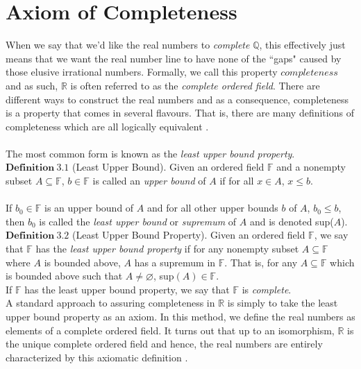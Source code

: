 \documentclass[12pt]{article}
\theoremstyle{definition}
\theoremstyle{remark}
\begin{document}
\section{Axiom of Completeness}
 When we say that we'd like the real numbers to \textit{complete} $\mathbb{Q}$, this effectively just means that we want the real number line to have none of the ``gaps" caused by those elusive irrational numbers. Formally, we call this property $\textit{completeness}$ and as such, $\mathbb{R}$ is often referred to as the \textit{complete ordered field}. There are different ways to construct the real numbers and as a consequence, completeness is a property that comes in several flavours. That is, there are many definitions of completeness which are all logically equivalent \cite[pg. 1]{approaches}.\\\\
The most common form is known as the \textit{least upper bound property}.\\

\noindent $\mathbf{Definition\ 3.1}$ (Least Upper Bound)\cite[pg.20]{paper}. Given an ordered field $\mathbb{F}$ and a nonempty subset $A\subseteq\mathbb{F}$, $b\in\mathbb{F}$ is called an \textit{upper bound} of $A$ if for all $x\in A$, $x\leq b$.\\\\
If $b_0\in\mathbb{F}$ is an upper bound of $A$ and for all other upper bounds $b$ of $A$, $b_0\leq b$, then $b_0$ is called the \textit{least upper bound} or \textit{supremum} of $A$ and is denoted sup($A$).\\

\noindent $\mathbf{Definition\ 3.2}$ (Least Upper Bound Property)\cite[pg.21]{paper}. Given an ordered field $\mathbb{F}$, we say that $\mathbb{F}$ has the \textit{least upper bound property} if for any nonempty subset $A\subseteq\mathbb{F}$ where $A$ is bounded above, $A$ has a supremum in $\mathbb{F}$. That is, for any $A\subseteq\mathbb{F}$ which is bounded above such that $A\neq\varnothing$, sup$(A)\in\mathbb{F}$.\\

\noindent If $\mathbb{F}$ has the least upper bound property, we say that $\mathbb{F}$ is \textit{complete}.\\

 \noindent A standard approach to assuring completeness in $\mathbb{R}$ is simply to take the least upper bound property as an axiom. In this method, we define the real numbers as elements of a complete ordered field. It turns out that up to an isomorphism, $\mathbb{R}$ is the unique complete ordered field and hence, the real numbers are entirely characterized by this axiomatic definition \cite{unique}.\\
 
\end{document}

